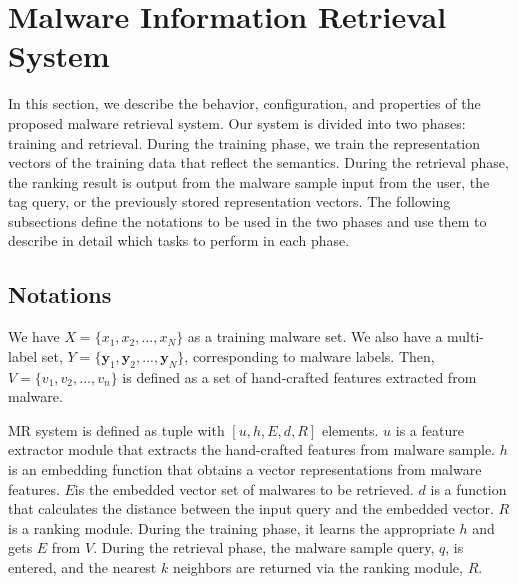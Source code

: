 \section{Malware Information Retrieval System}
In this section, we describe the behavior, configuration, and properties of the proposed malware retrieval system. Our system is divided into two phases: training and retrieval. During the training phase, we train the representation vectors of the training data that reflect the semantics. During the retrieval phase, the ranking result is output from the malware sample input from the user, the tag query, or the previously stored representation vectors. The following subsections define the notations to be used in the two phases and use them to describe in detail which tasks to perform in each phase.

\subsection{Notations}
We have $X = \{x_1, x_2, ..., x_N\}$ as a training malware set. We also have a multi-label set, $Y = \{\mathbf{y}_{1}, \mathbf{y}_{2}, ... , \mathbf{y}_{N}\}$, corresponding to malware labels. Then, $V = \{v_1, v_2, ..., v_n \}$ is defined as a set of hand-crafted features extracted from malware.

MR system is defined as tuple with $[u, h, E, d, R]$ elements. $u$ is a feature extractor module that extracts the hand-crafted features from malware sample. $h$ is an embedding function that obtains a vector representations from malware features. $E $is the embedded vector set of malwares to be retrieved. $d$ is a function that calculates the distance between the input query and the embedded vector. $R$ is a ranking module. During the training phase, it learns the appropriate $h$ and gets $E$ from $V$. During the retrieval phase, the malware sample query, $q$, is entered, and the nearest $k$ neighbors are returned via the ranking module, $R$.


